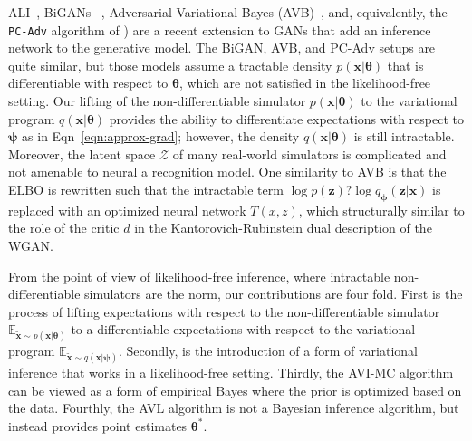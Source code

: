 \documentclass[twocolumn,superscriptaddress,aps]{revtex4-1}
\newcommand{\bftheta}{{\bm \theta}}
\newcommand{\bfpsi}{{\bm \psi}}
\newcommand{\bfphi}{{\bm \phi}}
\newcommand{\bfx}{\mathbf{x}}
\newcommand{\bfz}{\mathbf{z}}
\theoremstyle{plain}
\begin{document}
ALI~\citep{dumoulin2016adversarially}, BiGANs ~\citep{donahue2016adversarial}, Adversarial Variational Bayes (AVB)~\citep{DBLP:journals/corr/MeschederNG17}, and, equivalently, the \texttt{PC-Adv} algorithm of  \citep{2017arXiv170208235H})  are a recent extension to GANs that add an inference network to the generative model.  The BiGAN, AVB, and PC-Adv setups are quite similar, but those models assume a tractable density $p(\bfx|\bftheta)$ that is differentiable with respect to $\bftheta$, which are not satisfied in the likelihood-free setting. Our lifting of the non-differentiable simulator $p(\bfx|\bftheta)$ to the variational program $q(\bfx | \bftheta)$ provides the ability to differentiate expectations with respect to $\bfpsi$ as in Eqn~\ref{eqn:approx-grad}; however, the density $q(\bfx | \bftheta)$ is still intractable. Moreover, the latent space $\mathcal{Z}$ of many real-world simulators is complicated and not amenable to neural a recognition model. One similarity to AVB is that the ELBO is rewritten such that the intractable term $\log p(\bfz) ? \log q_\bfphi(\bfz | \bfx)$ is replaced with an optimized neural network $T(x,z)$, which structurally similar to the role of the critic $d$ in the Kantorovich-Rubinstein dual description of the WGAN.

From the point of view of likelihood-free inference, where intractable non-differentiable simulators are the norm, our contributions are four fold. First is the process of lifting expectations with respect to the non-differentiable simulator $\mathbb{E}_{\tilde{\bfx} \sim p(\bfx | \bftheta)}$ to a differentiable expectations with respect to the variational program $\mathbb{E}_{\tilde{\bfx} \sim q(\bfx | \bfpsi)}$. Secondly, is the introduction of a form of variational inference that works in a likelihood-free setting. Thirdly, the AVI-MC algorithm can be viewed as a form of empirical Bayes where the prior is optimized based on the data. Fourthly, the AVL algorithm is not a Bayesian inference algorithm, but instead provides point estimates $\bftheta^*$.
\end{document}
